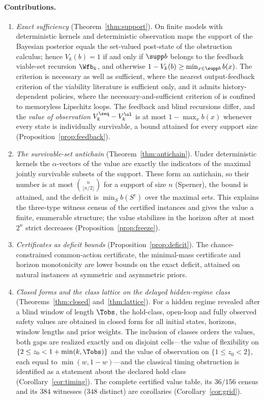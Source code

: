 \paragraph{Contributions.}
\begin{enumerate}[leftmargin=1.6em,itemsep=1pt]
\item \emph{Exact sufficiency} (Theorem~\ref{thm:support}). On finite models with deterministic kernels and deterministic observation maps the support of the Bayesian posterior equals the set-valued post-state of the obstruction calculus; hence $V_k(b)=1$ if and only if $\supp b$ belongs to the feedback viable-set recursion $\Wfb_k$, and otherwise $1-V_k(b)\ge\min_{x\in\supp b}b(x)$. The criterion is necessary as well as sufficient, where the nearest output-feedback criterion of the viability literature \cite{Veliov1993} is sufficient only, and it admits history-dependent policies, where the necessary-and-sufficient criterion of \cite{Doyen2000} is confined to memoryless Lipschitz loops. The feedback and blind recursions differ, and the \emph{value of observation} $V^{\seq}_k-V^{\ol}_k$ is at most $1-\max_x b(x)$ whenever every state is individually survivable, a bound attained for every support size (Proposition~\ref{prop:feedback}).
\item \emph{The survivable-set antichain} (Theorem~\ref{thm:antichain}). Under deterministic kernels the $\alpha$-vectors of the value are exactly the indicators of the maximal jointly survivable subsets of the support. These form an antichain, so their number is at most $\binom{n}{\lfloor n/2\rfloor}$ for a support of size $n$ (Sperner), the bound is attained, and the deficit is $\min_S b(S^{c})$ over the maximal sets. This explains the three-type witness census of the certified instances and gives the value a finite, enumerable structure; the value stabilizes in the horizon after at most $2^{n}$ strict decreases (Proposition~\ref{prop:freeze}).
\item \emph{Certificates as deficit bounds} (Proposition~\ref{prop:deficit}). The chance-constrained common-action certificate, the minimal-mass certificate and horizon monotonicity are lower bounds on the exact deficit, attained on natural instances at symmetric and asymmetric priors.
\item \emph{Closed forms and the class lattice on the delayed hidden-regime class} (Theorems~\ref{thm:closed} and~\ref{thm:lattice}). For a hidden regime revealed after a blind window of length $\Tobs$, the hold-class, open-loop and fully observed safety values are obtained in closed form for all initial states, horizons, window lengths and prior weights. The inclusion of classes orders the values, both gaps are realized exactly and on disjoint cells---the value of flexibility on $\{2\le z_0<1+\min(k,\Tobs)\}$ and the value of observation on $\{1\le z_0<2\}$, each equal to $\min(w,1-w)$---and the classical timing obstruction is identified as a statement about the declared hold class (Corollary~\ref{cor:timing}). The complete certified value table, its $36/156$ census and its $384$ witnesses ($348$ distinct) are corollaries (Corollary~\ref{cor:grid}).

\end{enumerate}
